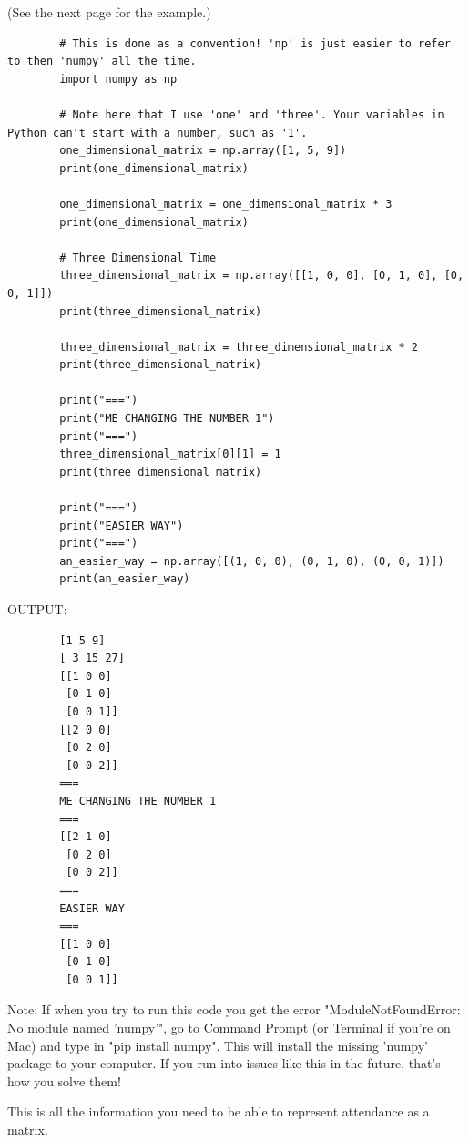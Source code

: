 \documentclass{article}
\begin{document}
    (See the next page for the example.)
    \newpage
    \begin{lstlisting}
        # This is done as a convention! 'np' is just easier to refer to then 'numpy' all the time.
        import numpy as np
        
        # Note here that I use 'one' and 'three'. Your variables in Python can't start with a number, such as '1'.
        one_dimensional_matrix = np.array([1, 5, 9])
        print(one_dimensional_matrix)
        
        one_dimensional_matrix = one_dimensional_matrix * 3
        print(one_dimensional_matrix)
        
        # Three Dimensional Time
        three_dimensional_matrix = np.array([[1, 0, 0], [0, 1, 0], [0, 0, 1]])
        print(three_dimensional_matrix)
        
        three_dimensional_matrix = three_dimensional_matrix * 2
        print(three_dimensional_matrix)
        
        print("===")
        print("ME CHANGING THE NUMBER 1")
        print("===")
        three_dimensional_matrix[0][1] = 1
        print(three_dimensional_matrix)
        
        print("===")
        print("EASIER WAY")
        print("===")
        an_easier_way = np.array([(1, 0, 0), (0, 1, 0), (0, 0, 1)])
        print(an_easier_way)
    \end{lstlisting}

    OUTPUT:
    \begin{lstlisting}
        [1 5 9]
        [ 3 15 27]
        [[1 0 0]
         [0 1 0]
         [0 0 1]]
        [[2 0 0]
         [0 2 0]
         [0 0 2]]
        ===
        ME CHANGING THE NUMBER 1
        ===
        [[2 1 0]
         [0 2 0]
         [0 0 2]]
        ===
        EASIER WAY
        ===
        [[1 0 0]
         [0 1 0]
         [0 0 1]]
    \end{lstlisting}

    Note: If when you try to run this code you get the error "ModuleNotFoundError: No module named 'numpy'", go to Command Prompt (or Terminal if you're on Mac) and type in "pip install numpy". This will install the missing 'numpy' package to your computer. If you run into issues like this in the future, that's how you solve them!

    This is all the information you need to be able to represent attendance as a matrix.
\end{document}

